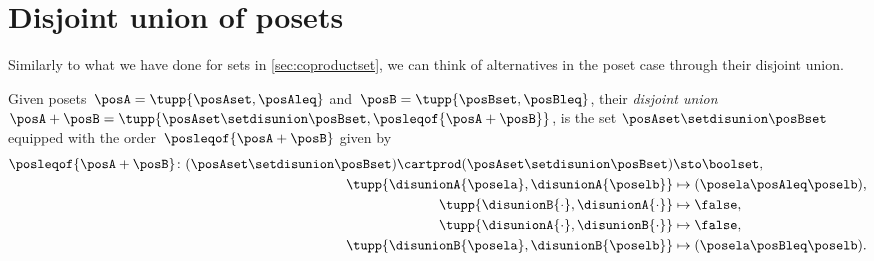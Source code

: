 
\section{Disjoint union of posets}
Similarly to what we have done for sets in \cref{sec:coproductset}, we can think of alternatives in the poset case through their disjoint union.

\begin{definition}
    Given posets~$\posA=\tupp{\posAset, \posAleq}$ and~$\posB=\tupp{\posBset, \posBleq}$, their \emph{disjoint union}~$\posA+\posB=\tupp{\posAset \setdisunion \posBset, \posleqof{\posA + \posB}}$, is the set $\posAset \setdisunion \posBset$ equipped with the order~$\posleqof{\posA + \posB}$ given by
    \begin{equation}
        \begin{aligned}
            \posleqof{\posA+\posB}\colon
            (\posAset\setdisunion\posBset)\cartprod (\posAset
            \setdisunion\posBset)                           & \sto \boolset, \\
            \tupp{\disunionA{\posela},\disunionA{\poselb} } &
            \mapsto (\posela\posAleq \poselb), \\
            \tupp{\disunionB{\cdot},\disunionA{\cdot} }     &
            \mapsto \false, \\
            \tupp{\disunionA{\cdot},\disunionB{\cdot}}      &
            \mapsto \false, \\
            \tupp{\disunionB{\posela},\disunionB{\poselb}}  &
            \mapsto (\posela\posBleq \poselb).
        \end{aligned}
    \end{equation}
\end{definition}

